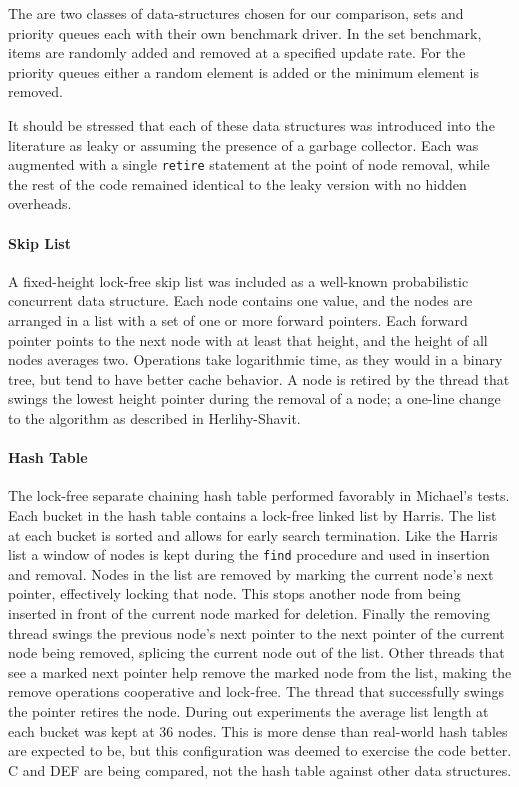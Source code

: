 
The are two classes of data-structures chosen for our comparison, sets and priority queues each with their own benchmark driver. In the set benchmark, items are randomly added and removed at a specified update rate. For the priority queues either a random element is added or the minimum element is removed.

It should be stressed that each of these data structures was introduced into the literature as leaky or assuming the presence of a garbage collector.  Each was augmented with a single \texttt{retire} statement at the point of node removal, while the rest of the code remained identical to the leaky version with no hidden overheads.

\paragraph{Skip List} A fixed-height lock-free skip list was included as a well-known probabilistic concurrent data structure.  Each node contains one value, and the nodes are arranged in a list with a set of one or more forward pointers.  Each forward pointer points to the next node with at least that height, and the height of all nodes averages two.  Operations take logarithmic time, as they would in a binary tree, but tend to have better cache behavior. A node is retired by the thread that swings the lowest height pointer during the removal of a node; a one-line change to the algorithm as described in Herlihy-Shavit.\cite{HSBook}

\paragraph{Hash Table} The lock-free separate chaining hash table performed favorably in Michael's tests.\cite{HashTables} Each bucket in the hash table contains a lock-free linked list by Harris.\cite{Harris} The list at each bucket is sorted and allows for early search termination. Like the Harris list a window of nodes is kept during the \texttt{find} procedure and used in insertion and removal. Nodes in the list are removed by marking the current node's next pointer, effectively locking that node. This stops another node from being inserted in front of the current node marked for deletion. Finally the removing thread swings the previous node's next pointer to the next pointer of the current node being removed, splicing the current node out of the list. Other threads that see a marked next pointer help remove the marked node from the list, making the remove operations cooperative and lock-free.  The thread that successfully swings the pointer retires the node.  During out experiments the average list length at each bucket was kept at 36 nodes.  This is more dense than real-world hash tables are expected to be, but this configuration was deemed to exercise the code better.  C and DEF are being compared, not the hash table against other data structures.


